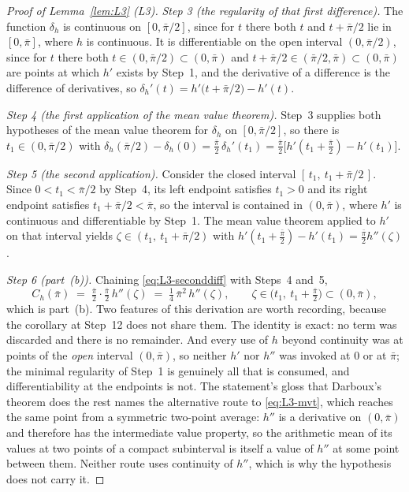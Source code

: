 \documentclass[11pt]{article}
\begin{document}
\begin{proof}[Proof of Lemma~\ref{lem:L3} (L3)]
\emph{Step 3 (the regularity of that first difference).} The function $\delta_h$ is continuous on
$[0,\bar\pi/2]$, since for $t$ there both $t$ and $t+\bar\pi/2$ lie in $[0,\bar\pi]$, where $h$ is
continuous. It is differentiable on the open interval $(0,\bar\pi/2)$, since for $t$ there both
$t \in (0,\bar\pi/2) \subset (0,\bar\pi)$ and
$t+\bar\pi/2 \in (\bar\pi/2,\bar\pi) \subset (0,\bar\pi)$ are points at which $h'$ exists by Step~1,
and the derivative of a difference is the difference of derivatives, so
$\delta_h'(t) = h'\bigl(t+\bar\pi/2\bigr) - h'(t)$.

\emph{Step 4 (the first application of the mean value theorem).} Step~3 supplies both hypotheses of
the mean value theorem for $\delta_h$ on $[0,\bar\pi/2]$, so there is $t_1 \in (0,\bar\pi/2)$ with
$\delta_h(\bar\pi/2) - \delta_h(0)
 = \tfrac{\bar\pi}{2}\,\delta_h'(t_1)
 = \tfrac{\bar\pi}{2}\bigl[h'(t_1+\tfrac{\bar\pi}{2}) - h'(t_1)\bigr]$.

\emph{Step 5 (the second application).} Consider the closed interval
$[\,t_1,\ t_1+\bar\pi/2\,]$. Since $0 < t_1 < \bar\pi/2$ by Step~4, its left endpoint satisfies
$t_1 > 0$ and its right endpoint satisfies $t_1+\bar\pi/2 < \bar\pi$, so the interval is contained in
$(0,\bar\pi)$, where $h'$ is continuous and differentiable by Step~1. The mean value theorem applied
to $h'$ on that interval yields $\zeta \in (t_1,\ t_1+\bar\pi/2)$ with
$h'(t_1+\tfrac{\bar\pi}{2}) - h'(t_1) = \tfrac{\bar\pi}{2}h''(\zeta)$.

\emph{Step 6 (part~(b)).} Chaining \eqref{eq:L3-seconddiff} with Steps~4 and~5,
\begin{equation}
\label{eq:L3-mvt}
C_h(\bar\pi) \;=\; \tfrac{\bar\pi}{2}\cdot\tfrac{\bar\pi}{2}\,h''(\zeta)
 \;=\; \tfrac14\,\bar\pi^2\,h''(\zeta),
\qquad \zeta \in \bigl(t_1,\ t_1+\tfrac{\bar\pi}{2}\bigr) \subset (0,\bar\pi),
\end{equation}
which is part~(b). Two features of this derivation are worth recording, because the corollary at
Step~12 does not share them. The identity is exact: no term was discarded and there is no remainder.
And every use of $h$ beyond continuity was at points of the \emph{open} interval $(0,\bar\pi)$, so
neither $h'$ nor $h''$ was invoked at $0$ or at $\bar\pi$; the minimal regularity of Step~1 is
genuinely all that is consumed, and differentiability at the endpoints is not. The statement's gloss
that Darboux's theorem does the rest names the alternative route to \eqref{eq:L3-mvt}, which reaches
the same point from a symmetric two-point average: $h''$ is a derivative on $(0,\bar\pi)$ and
therefore has the intermediate value property, so the arithmetic mean of its values at two points of
a compact subinterval is itself a value of $h''$ at some point between them. Neither route uses
continuity of $h''$, which is why the hypothesis does not carry it.


\end{proof}
\end{document}

